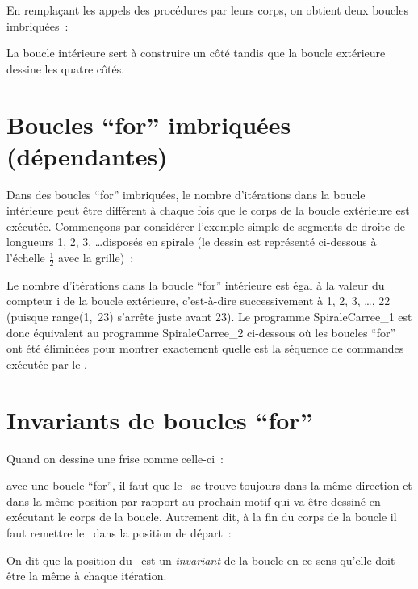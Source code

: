 En remplaçant les appels des procédures par leurs corps, on obtient
deux boucles imbriquées~:



La boucle intérieure sert à construire un côté tandis que la boucle
ex\-té\-rieu\-re dessine les quatre côtés.

\newpage
\section{Boucles ``for'' imbriquées (dépendantes)}

Dans des boucles ``for'' imbriquées, le nombre d'itérations
dans la boucle in\-té\-rieu\-re peut être dif\-fé\-rent à chaque fois que le corps de
la boucle extérieure est exécutée. Commençons par considérer l'exemple
simple de segments de droite de longueurs 1, 2, 3, \ldots disposés en spirale
(le dessin est représenté ci-dessous à l'échelle $\frac{1}{2}$ avec la grille)~:\\[5cm]
%
\vspace*{-5cm}%

\vspace{2.6cm}%

Le nombre d'itérations dans la boucle ``for'' intérieure est égal à la valeur
du compteur {\idt i} de la boucle extérieure, c'est-à-dire successivement à 1, 2,
3, \ldots, 22 (puisque {\idt range(1,\ 23)} s'arrête juste avant 23). Le programme {\idt SpiraleCarree\_1} est donc équivalent au
programme {\idt SpiraleCarree\_2} ci-dessous où les boucles ``for'' ont été
éliminées pour montrer exactement quelle est la séquence de commandes exécutée
par le \robot.



\section{Invariants de boucles ``for''}

Quand on dessine une frise comme celle-ci~:\\[9mm]
%
\vspace*{-9mm}%

\noindent avec une boucle ``for'', il faut que le \robot\ se trouve toujours dans
la même direction
et dans la même position par rapport au prochain motif qui va être
dessiné en exécutant
le corps de la boucle. Autrement dit, à la fin du corps de la
boucle il faut
remettre le \robot\ dans la position de départ~:

On dit que la position du \robot\ est un {\em invariant} de la boucle en ce sens
qu'elle doit être la même à chaque itération.

